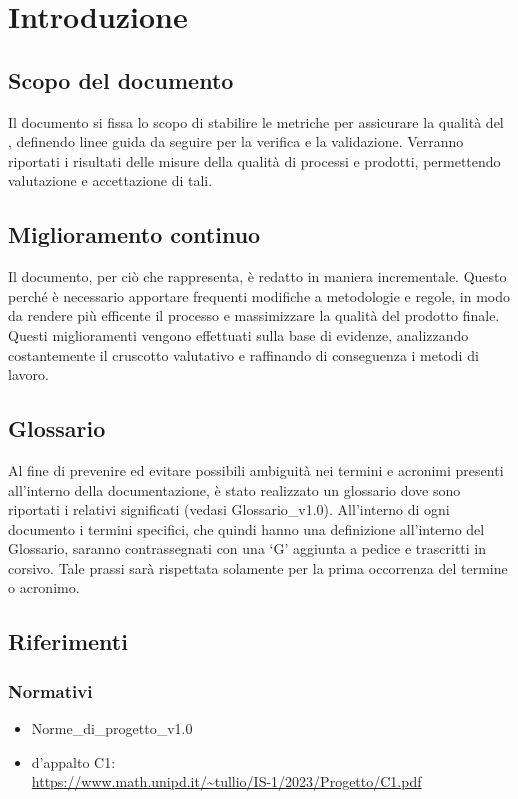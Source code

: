 \chapter{Introduzione}\label{chap:intro}

\section{Scopo del documento}
Il documento si fissa lo scopo di stabilire le metriche per assicurare la qualità del , definendo linee guida da seguire per la verifica e la validazione. Verranno riportati i risultati delle misure della qualità di processi e prodotti, permettendo valutazione e accettazione di tali.

\section{Miglioramento continuo}
Il documento, per ciò che rappresenta, è redatto in maniera incrementale. Questo perché è necessario apportare frequenti modifiche a metodologie e regole, in modo da rendere più efficente il processo e massimizzare la qualità del prodotto finale. Questi miglioramenti vengono effettuati sulla base di evidenze, analizzando costantemente il cruscotto valutativo e raffinando di conseguenza i metodi di lavoro.

\section{Glossario}
Al fine di prevenire ed evitare possibili ambiguità nei termini e acronimi presenti all’interno della documentazione, è stato realizzato un glossario dove sono riportati i relativi significati (vedasi Glossario\_v1.0). All’interno di ogni documento i termini specifici, che quindi hanno una definizione all’interno del Glossario, saranno contrassegnati con una ‘G’ aggiunta a pedice e trascritti in corsivo. Tale prassi sarà rispettata solamente per la prima occorrenza del termine o acronimo.

\section{Riferimenti}
\subsection{Normativi}
\begin{itemize}
    \item Norme\_di\_progetto\_v1.0
    \item {} d'appalto C1: \\ \url{https://www.math.unipd.it/~tullio/IS-1/2023/Progetto/C1.pdf}
\end{itemize}

